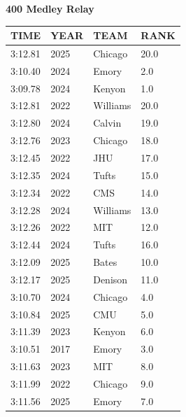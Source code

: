 \begin{table}[H]
\centering
\begin{minipage}[t]{0.6\textwidth}
\centering
\textbf{400 Medley Relay}\\[0.1cm]
\begin{tabular}{@{}p{1.8cm}p{1.2cm}p{1.4cm}p{0.8cm}@{}}
\hline
    \textbf{TIME} & \textbf{YEAR} & \textbf{TEAM} & \textbf{RANK} \\
\hline
    3:12.81 & 2025 & Chicago & 20.0 \\
    3:10.40 & 2024 & Emory & 2.0 \\
    3:09.78 & 2024 & Kenyon & 1.0 \\
    3:12.81 & 2022 & Williams & 20.0 \\
    3:12.80 & 2024 & Calvin & 19.0 \\
    3:12.76 & 2023 & Chicago & 18.0 \\
    3:12.45 & 2022 & JHU & 17.0 \\
    3:12.35 & 2024 & Tufts & 15.0 \\
    3:12.34 & 2022 & CMS & 14.0 \\
    3:12.28 & 2024 & Williams & 13.0 \\
    3:12.26 & 2022 & MIT & 12.0 \\
    3:12.44 & 2024 & Tufts & 16.0 \\
    3:12.09 & 2025 & Bates & 10.0 \\
    3:12.17 & 2025 & Denison & 11.0 \\
    3:10.70 & 2024 & Chicago & 4.0 \\
    3:10.84 & 2025 & CMU & 5.0 \\
    3:11.39 & 2023 & Kenyon & 6.0 \\
    3:10.51 & 2017 & Emory & 3.0 \\
    3:11.63 & 2023 & MIT & 8.0 \\
    3:11.99 & 2022 & Chicago & 9.0 \\
    3:11.56 & 2025 & Emory & 7.0 \\
\hline
\end{tabular}
\end{minipage}
\end{table}

